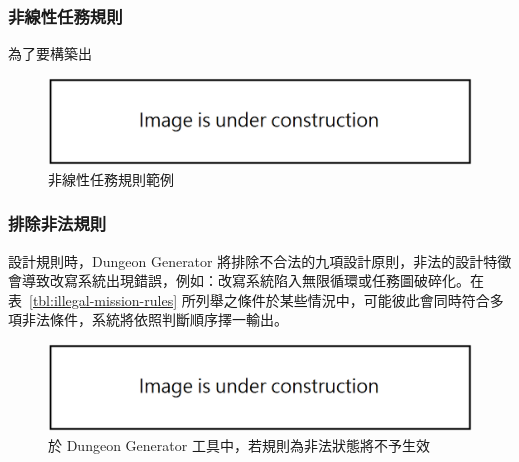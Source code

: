 \subsubsection{非線性任務規則}
\label{sssec:method-missiongrammars-rules-nonlinearrules}

為了要構築出


\begin{figure}[ht]
  \begin{center}
    \includegraphics[width=1.0\textwidth]{figures/under_construction.png}
    \caption{非線性任務規則範例} 
    \label{fig:missiongrammars-rules-nonlinear-example}
  \end{center}
\end{figure}

\subsubsection{排除非法規則}
\label{sssec:method-missiongrammars-rules-illegals}

設計規則時，Dungeon Generator 將排除不合法的九項設計原則，非法的設計特徵會導致改寫系統出現錯誤，例如：改寫系統陷入無限循環或任務圖破碎化。在表~\ref{tbl:illegal-mission-rules} 所列舉之條件於某些情況中，可能彼此會同時符合多項非法條件，系統將依照判斷順序擇一輸出。

\begin{figure}[ht]
  \begin{center}
    \includegraphics[width=1.0\textwidth]{figures/under_construction.png}
    \caption{於 Dungeon Generator 工具中，若規則為非法狀態將不予生效} 
    \label{fig:missiongrammars-illegal-rules}
  \end{center}
\end{figure}

